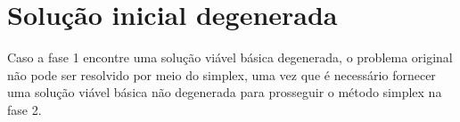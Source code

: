 \documentclass[
	12pt,				%
	openright,			%
	oneside,			%
	a4paper,			%
	english,			%
	french,				%
	spanish,			%
	brazil,				%
	]{abntex2}
\begin{document}
%
%
%
%
%
%
%
%
%
%
%
%
%
%
%
%
%
%
%
%
%

\section{Solução inicial degenerada}
Caso a fase 1 encontre uma solução viável básica degenerada, o problema original não pode ser resolvido por meio do simplex, uma vez que é necessário fornecer uma solução viável básica não degenerada para prosseguir o método simplex na fase 2.
\end{document}
